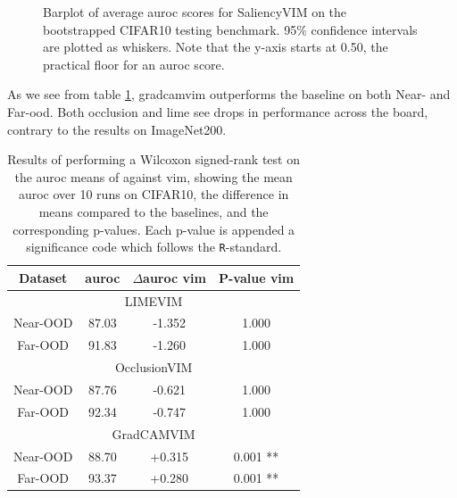 \documentclass[UKenglish]{uiomasterthesis} %
\theoremstyle{definition}
\begin{document}
\begin{figure}[H]
    \begin{center}
        
    \end{center}
    \caption[CIFAR10 SaliencyVIM Bootstrap]{Barplot of average \ac{auroc} scores for SaliencyVIM on the bootstrapped CIFAR10 testing benchmark. 95\% confidence intervals are plotted as whiskers. Note that the y-axis starts at 0.50, the practical floor for an \ac{auroc} score.}
    \label{fig:cifar10_salvim_bootstrap_barplot}
\end{figure}

As we see from table \ref{table:cifar10_salvim_ttest}, \ac{gradcam}\ac{vim} outperforms the baseline on both Near- and Far-\ac{ood}. Both occlusion and \ac{lime} see drops in performance across the board, contrary to the results on ImageNet200.

\begin{table}[H]
\setlength\tabcolsep{3pt}
\begin{center}
\begin{tabular}{ |c|c|c|c| }
    \hline
    Dataset & \ac{auroc} & $\Delta$\ac{auroc} \ac{vim} & P-value \ac{vim} \\
    \hline
    \hline
    \multicolumn{4}{|c|}{LIMEVIM} \\
    \hline
    \rowcolor{near!50}
    Near-OOD & 87.03 & -1.352 & 1.000 \\
    \rowcolor{far!50}
    Far-OOD & 91.83 & -1.260 & 1.000 \\
    \hline
    \hline
    \multicolumn{4}{|c|}{OcclusionVIM} \\
    \hline
    \rowcolor{near!50}
    Near-OOD & 87.76 & -0.621 & 1.000 \\
    \rowcolor{far!50}
    Far-OOD & 92.34 & -0.747 & 1.000 \\
    \hline
    \hline
    \multicolumn{4}{|c|}{GradCAMVIM} \\
    \hline
    \rowcolor{near!50}
    Near-OOD & 88.70 & +0.315 & 0.001 ** \\
    \rowcolor{far!50}
    Far-OOD & 93.37 & +0.280 & 0.001 ** \\
    \hline
    \end{tabular}
    \caption[Wilcoxon signed-rank test for SaliencyVIM on CIFAR10]{Results of performing a Wilcoxon signed-rank test on the \ac{auroc} means of against \ac{vim}, showing the mean \ac{auroc} over 10 runs on CIFAR10, the difference in means compared to the baselines, and the corresponding p-values. Each p-value is appended a significance code which follows the \texttt{R}-standard.}
    \label{table:cifar10_salvim_ttest}
\end{center}
\setlength\tabcolsep{6pt}
\end{table}
\end{document}
